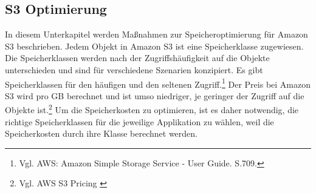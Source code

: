 \subsection{S3 Optimierung}
In diesem Unterkapitel werden Maßnahmen zur Speicheroptimierung für Amazon S3 beschrieben. Jedem Objekt in Amazon S3 ist eine Speicherklasse zugewiesen. Die Speicherklassen werden nach der Zugriffshäufigkeit auf die Objekte unterschieden und sind für verschiedene Szenarien konzipiert. Es gibt Speicherklassen für den häufigen und den seltenen Zugriff.\footnote{Vgl. AWS: Amazon Simple Storage Service - User Guide. S.709.\cite{AMZ18}} Der Preis bei Amazon S3 wird pro GB berechnet und ist umso niedriger, je geringer der Zugriff auf die Objekte ist.\footnote{Vgl. AWS S3 Pricing \cite{AMZ09}} Um die Speicherkosten zu optimieren, ist es daher notwendig, die richtige Speicherklassen für die jeweilige Applikation zu wählen, weil die Speicherkosten durch ihre Klasse berechnet werden.

